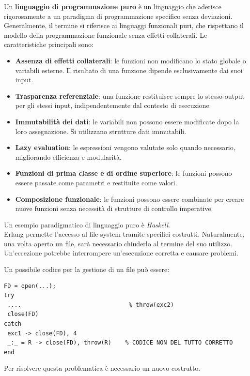 \documentclass{article}
\begin{document}
Un \textbf{linguaggio di programmazione puro} è un linguaggio che aderisce rigorosamente a un paradigma di programmazione specifico senza deviazioni. Generalmente, il termine si riferisce ai linguaggi funzionali puri, che rispettano il modello della programmazione funzionale senza effetti collaterali. Le caratteristiche principali sono:
\begin{itemize}
    \item \textbf{Assenza di effetti collaterali}: le funzioni non modificano lo stato globale o variabili esterne. Il risultato di una funzione dipende esclusivamente dai suoi input.
    \item \textbf{Trasparenza referenziale}: una funzione restituisce sempre lo stesso output per gli stessi input, indipendentemente dal contesto di esecuzione.
    \item \textbf{Immutabilità dei dati}: le variabili non possono essere modificate dopo la loro assegnazione. Si utilizzano strutture dati immutabili.
    \item \textbf{Lazy evaluation}: le espressioni vengono valutate solo quando necessario, migliorando efficienza e modularità.
    \item \textbf{Funzioni di prima classe e di ordine superiore}: le funzioni possono essere passate come parametri e restituite come valori.
    \item \textbf{Composizione funzionale}: le funzioni possono essere combinate per creare nuove funzioni senza necessità di strutture di controllo imperative.
\end{itemize}
Un esempio paradigmatico di linguaggio puro è \textit{Haskell}.\vspace{14pt}\\
Erlang permette l'accesso al file system tramite specifici costrutti. Naturalmente, una volta aperto un file, sarà necessario chiuderlo al termine del suo utilizzo. Un'eccezione potrebbe interrompere un'esecuzione corretta e causare problemi.

\pagebreak

Un possibile codice per la gestione di un file può essere:
\begin{tcolorbox}
\begin{verbatim}
FD = open(...);
try
 ....                               % throw(exc2)
 close(FD)
catch
 exc1 -> close(FD), 4
 _:_ = R -> close(FD), throw(R)    % CODICE NON DEL TUTTO CORRETTO
end
\end{verbatim}
\end{tcolorbox}
\vspace{8pt}
Per risolvere questa problematica è necessario un nuovo costrutto.
\end{document}
